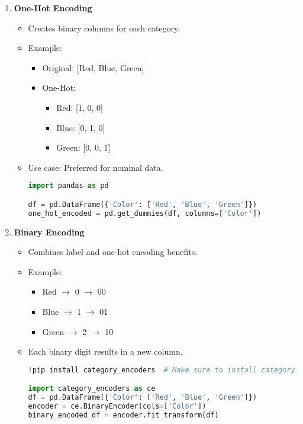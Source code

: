 \documentclass[aspectratio=169]{beamer}
\begin{document}
\begin{frame}[fragile]
\begin{enumerate}
        \item \textbf{One-Hot Encoding}
            \begin{itemize}
                \item Creates binary columns for each category.
                \item Example:
                \begin{itemize}
                    \item Original: [Red, Blue, Green]
                    \item One-Hot: 
                    \begin{itemize}
                        \item Red: [1, 0, 0]
                        \item Blue: [0, 1, 0]
                        \item Green: [0, 0, 1]
                    \end{itemize}
                \end{itemize}
                \item Use case: Preferred for nominal data.
                \begin{lstlisting}[language=Python]
import pandas as pd

df = pd.DataFrame({'Color': ['Red', 'Blue', 'Green']})
one_hot_encoded = pd.get_dummies(df, columns=['Color'])
\end{lstlisting}
            \end{itemize}

        \item \textbf{Binary Encoding}
            \begin{itemize}
                \item Combines label and one-hot encoding benefits.
                \item Example:
                \begin{itemize}
                    \item Red $\rightarrow$ 0 $\rightarrow$ 00
                    \item Blue $\rightarrow$ 1 $\rightarrow$ 01
                    \item Green $\rightarrow$ 2 $\rightarrow$ 10
                \end{itemize}
                \item Each binary digit results in a new column.
                \begin{lstlisting}[language=Python]
!pip install category_encoders  # Make sure to install category_encoders package

import category_encoders as ce
df = pd.DataFrame({'Color': ['Red', 'Blue', 'Green']})
encoder = ce.BinaryEncoder(cols=['Color'])
binary_encoded_df = encoder.fit_transform(df)
\end{lstlisting}
            \end{itemize}
    \end{enumerate}
\end{frame}
\end{document}
